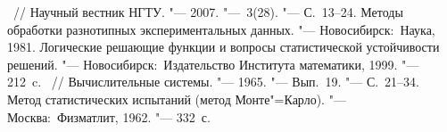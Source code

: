 \documentclass[twoside]{article}
\begin{document}
\begin{thebibliography}{1}
    ~//
    Научный вестник НГТУ. "---
    2007. "---  \No\,3(28). "---   \mbox{С.~13--24}.
    Методы обработки разнотипных экспериментальных данных. "---
    Новосибирск:~Наука, 1981.
    Логические решающие функции и вопросы статистической устойчивости решений. "---
    Новосибирск:~Издательство Института математики, 1999. "--- 212~c.
    ~//
    Вычислительные системы. "---
    1965. "---  Вып.~19. "---   С.~21--34.
    Метод статистических испытаний (метод Монте"=Карло). "---
    Москва:~Физматлит, %
    1962. "--- 332~с.

\end{thebibliography}
\end{document}
